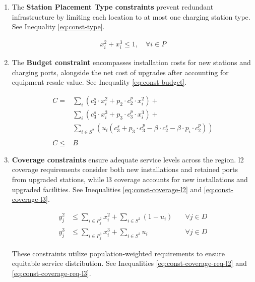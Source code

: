 \begin{enumerate}
    \item The \textbf{Station Placement Type constraints} prevent redundant infrastructure by limiting each location to at most one charging station type. See Inequality \ref{eq:const-type}.

    \begin{align}
        x^2_i + x^3_i \leq 1, \quad \forall i \in P
        \label{eq:const-type}
    \end{align}

    \item The \textbf{Budget constraint} encompasses installation costs for new stations and charging ports, alongside the net cost of upgrades after accounting for equipment resale value. See Inequality \ref{eq:const-budget}.

    \begin{align}
        C =
        & \sum_{i}(c_2^s \cdot x^2_i + p_2 \cdot c_2^p \cdot x^2_i) + \nonumber \label{eq:net-cost} \\ 
        & \sum_{i}(c_3^s \cdot x^3_i + p_3 \cdot c_3^p \cdot x^3_i) + \nonumber \\
        & \sum_{i \in S^2}(u_i (c_3^s + p_3 \cdot c_3^p - \beta \cdot c_2^s - \beta \cdot p_i \cdot c_2^p)) \\
        \nonumber \\
        C \leq &  B \label{eq:const-budget}
    \end{align}

    \item \textbf{Coverage constraints} ensure adequate service levels across the region. \gls{l2} coverage requirements consider both new installations and retained ports from upgraded stations, while \gls{l3} coverage accounts for new installations and upgraded facilities. See Inequalities \ref{eq:const-coverage-l2} and \ref{eq:const-coverage-l3}.

    \begin{align}
        y^2_j & \leq \sum_{i \in P^2_j} x^2_i + \sum_{i \in S^2} (1-u_i) & \quad \forall j \in D 
        \label{eq:const-coverage-l2} \\
        y^3_j & \leq \sum_{i \in P^3_j} x^3_i + \sum_{i \in S^2} u_i & \quad \forall j \in D 
        \label{eq:const-coverage-l3}
    \end{align}
    
    These constraints utilize population-weighted requirements to ensure equitable service distribution. See Inequalities \ref{eq:const-coverage-req-l2} and \ref{eq:const-coverage-req-l3}.


\end{enumerate}
